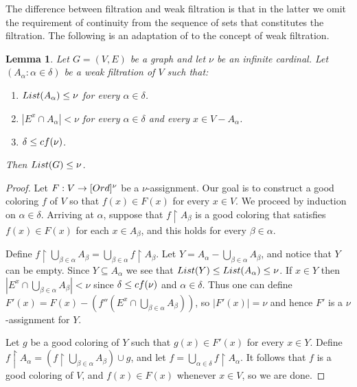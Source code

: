 \documentclass[11pt]{amsart}
\newtheorem{lemma}[theorem]{Lemma}
\theoremstyle{definition}
\theoremstyle{remark}
\newcommand{\cf}{{\rm cf}}
\begin{document}
The difference between filtration and weak filtration is that in the latter we omit the requirement of continuity from the sequence of sets that constitutes the filtration.
The following is an adaptation of \cite[Lemma 3.5]{MR4732367} to the concept of weak filtration.

\begin{lemma}
\label{lem3.5} Let $G=(V,E)$ be a graph and let $\nu$ be an infinite cardinal.
Let $(A_\alpha:\alpha\in\delta)$ be a weak filtration of $V$ such that:
\begin{enumerate}
\item [$(\aleph)$] ${\rm List}(A_\alpha)\leq\nu$ for every $\alpha\in\delta$.
\item [$(\beth)$] $|E^x\cap A_\alpha|<\nu$ for every $\alpha\in\delta$ and every $x\in V-A_\alpha$.
\item [$(\gimel)$] $\delta\leq\cf(\nu)$.
\end{enumerate}
Then ${\rm List}(G)\leq\nu$.
\end{lemma}

\begin{proof}
  Let $F:V\rightarrow[{\rm Ord}]^\nu$ be a $\nu$-assignment.
  Our goal is to construct a good coloring $f$ of $V$ so that $f(x)\in F(x)$ for every $x\in{V}$.
  We proceed by induction on $\alpha\in\delta$.
  Arriving at $\alpha$, suppose that $f\upharpoonright{A_\beta}$ is a good coloring that satisfies $f(x)\in F(x)$ for each $x\in{A_\beta}$, and this holds for every $\beta\in\alpha$.

  Define $f\upharpoonright\bigcup_{\beta\in\alpha}A_\beta = \bigcup_{\beta\in\alpha}f\upharpoonright{A_\beta}$.
  Let $Y=A_\alpha-\bigcup_{\beta\in\alpha}A_\beta$, and notice that $Y$ can be empty.
  Since $Y\subseteq{A_\alpha}$ we see that ${\rm List}(Y)\leq{\rm List}(A_\alpha)\leq\nu$.
  If $x\in{Y}$ then $|E^x\cap\bigcup_{\beta\in\alpha}A_\beta|<\nu$ since $\delta\leq\cf(\nu)$ and $\alpha\in\delta$.
  Thus one can define $F'(x)=F(x)-(f''(E^x\cap\bigcup_{\beta\in\alpha}A_\beta))$, so $|F'(x)|=\nu$ and hence $F'$ is a $\nu$-assignment for $Y$.

  Let $g$ be a good coloring of $Y$ such that $g(x)\in F'(x)$ for every $x\in{Y}$.
  Define $f\upharpoonright{A_\alpha} = (f\upharpoonright\bigcup_{\beta\in\alpha}A_\beta)\cup{g}$, and let $f=\bigcup_{\alpha\in\delta}f\upharpoonright{A_\alpha}$.
  It follows that $f$ is a good coloring of $V$, and $f(x)\in F(x)$ whenever $x\in{V}$, so we are done.
\end{proof}
\end{document}
